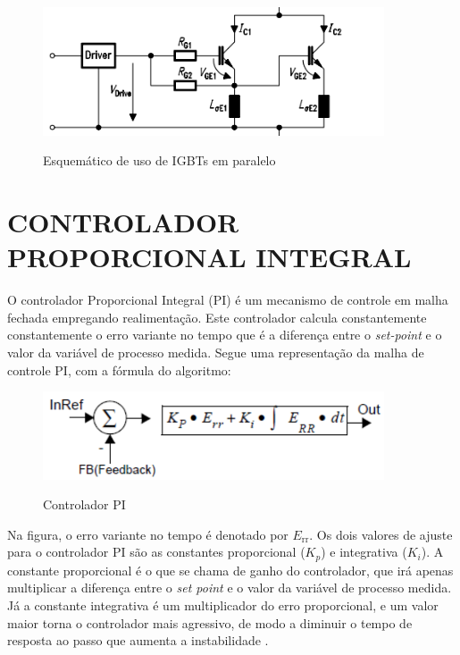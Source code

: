 \begin{figure}[!htb]
    \centering
    \caption{Esquemático de uso de IGBTs em paralelo}
    \includegraphics[width=0.9\textwidth]{./dados/figuras/paralleligbt}
    \label{fig:figura-paralleligbt}
\end{figure}

\section{CONTROLADOR PROPORCIONAL INTEGRAL}
\label{sec:pi-controller}
O controlador Proporcional Integral (PI) é um mecanismo de controle em malha fechada empregando realimentação. Este controlador calcula constantemente constantemente o erro variante no tempo que é a diferença entre o \textit{set-point} e o valor da variável de processo medida. Segue uma representação da malha de controle PI, com a fórmula do algoritmo:

\begin{figure}[H]
    \centering
    \caption{Controlador PI}
    \includegraphics[width=0.9\textwidth]{./dados/figuras/pi-controller}
    \label{fig:figura-pi-controller}
\end{figure}

Na figura, o erro variante no tempo é denotado por $E_\mathrm{rr}$.
Os dois valores de ajuste para o controlador PI são as constantes proporcional ($K_p$)  e integrativa ($K_i$). A constante proporcional é o que se chama de ganho do controlador, que irá apenas multiplicar a diferença entre o \textit{set point} e o valor da variável de processo medida. Já a constante integrativa é um multiplicador do erro proporcional, e um valor maior torna o controlador mais agressivo, de modo a diminuir o tempo de resposta ao passo que aumenta a instabilidade \cite{Apmonitor}.


